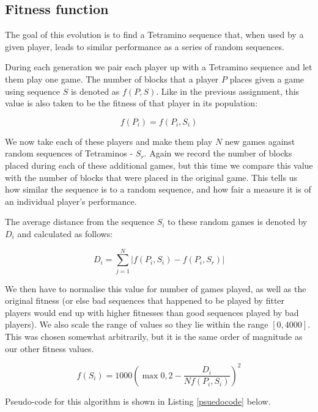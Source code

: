 \documentclass[a4paper,11pt]{article}
\begin{document}
\subsection{Fitness function}

The goal of this evolution is to find a Tetramino sequence that, when used by
a given player, leads to similar performance as a series of random sequences.

During each generation we pair each player up with a Tetramino sequence and let
them play one game.
The number of blocks that a player $P$ places given a game using sequence $S$
is denoted as $f(P, S)$.
Like in the previous assignment, this value is also taken to be the fitness of
that player in its population:

\begin{equation}
  f(P_i) = f(P_i, S_i)
\end{equation}

We now take each of these players and make them play $N$ new games against
random sequences of Tetraminos - $S_r$.
Again we record the number of blocks placed during each of these additional
games, but this time we compare this value with the number of blocks that were
placed in the original game.
This tells us how similar the sequence is to a random sequence, and how fair a
measure it is of an individual player's performance.

The average distance from the sequence $S_i$ to these random games is denoted
by $D_i$ and calculated as follows:

\begin {equation}
  D_i = \sum_{j=1}^{N} \left| f\left( P_i, S_i\right) - f\left( P_i, S_r \right) \right|
\end{equation}

We then have to normalise this value for number of games played, as well as the
original fitness (or else bad sequences that happened to be played by fitter
players would end up with higher fitnesses than good sequences played by bad
players).
We also scale the range of values so they lie within the range $[0, 4000]$.
This was chosen somewhat arbitrarily, but it is the same order of magnitude
as our other fitness values.

\begin{equation}
  f(S_i) = 1000 \left( \max 0, 2 - \frac{D_i}{ N f\left( P_i, S_i\right) } \right)^2
\end {equation}

Pseudo-code for this algorithm is shown in Listing \ref{psuedocode} below.
\end{document}
